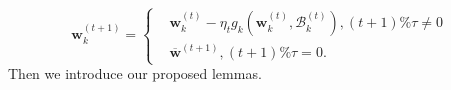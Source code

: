 \documentclass[10pt,journal,compsoc]{IEEEtran}
\newtheorem{lemma}{Lemma}
\newcommand{\w}{\mathbf{w}}
\newcommand{\s}{S_a^{(t)}}
\newcommand{\B}{\mathcal{B}}
\begin{document}
\begin{equation}
\label{localUpdate}
\w_k^{(t+1)} = \left\{
\begin{aligned}
& \w_k^{(t)} - \eta_t g_k(\w_k^{(t)},\B_k^{(t)}), (t+1) \% \tau \neq 0 \\
&\overline{\w}^{(t+1)}, (t+1) \% \tau = 0.
\end{aligned}
\right.
\end{equation}Then we introduce our proposed lemmas.
\end{document}
